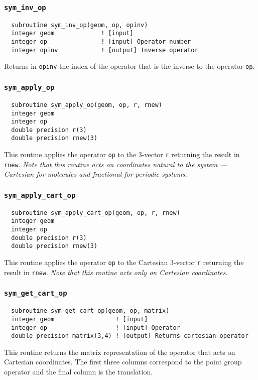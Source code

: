 \subsubsection{{\tt sym\_inv\_op}}
\label{sec:syminvop}
\begin{verbatim}
  subroutine sym_inv_op(geom, op, opinv)
  integer geom             ! [input]
  integer op               ! [input] Operator number
  integer opinv            ! [output] Inverse operator
\end{verbatim}
Returns in \verb+opinv+ the index of the operator that is
the inverse to the operator \verb+op+.

\subsubsection{{\tt sym\_apply\_op}}
\begin{verbatim}
  subroutine sym_apply_op(geom, op, r, rnew)
  integer geom
  integer op
  double precision r(3)
  double precision rnew(3)
\end{verbatim}
This routine  applies the operator \verb+op+ to the 3-vector \verb+r+ returning the
result in \verb+rnew+.  {\em Note that this routine acts on
  coordinates natural to the system --- Cartesian for molecules and
  fractional for periodic systems.}

\subsubsection{{\tt sym\_apply\_cart\_op}}
\begin{verbatim}
  subroutine sym_apply_cart_op(geom, op, r, rnew)
  integer geom
  integer op
  double precision r(3)
  double precision rnew(3)
\end{verbatim}
This routine  applies the operator \verb+op+ to the Cartesian 3-vector \verb+r+
returning the result in \verb+rnew+.  {\em Note that this routine acts
  only on Cartesian coordinates.}

\subsubsection{{\tt sym\_get\_cart\_op}}
\begin{verbatim}
  subroutine sym_get_cart_op(geom, op, matrix)
  integer geom                 ! [input]
  integer op                   ! [input] Operator
  double precision matrix(3,4) ! [output] Returns cartesian operator
\end{verbatim}
This routine  returns the matrix representation of the operator that acts on
Cartesian coordinates.  The first three columns correspond to the
point group operator and the final column is the translation.

